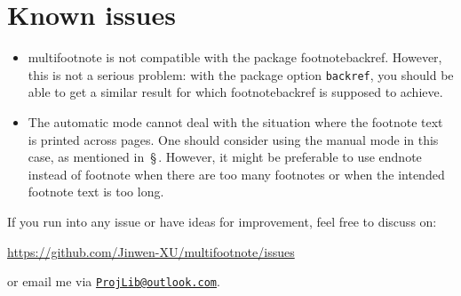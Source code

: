\documentclass[classical]{einfart}
\newcommand{\packageoption}[1]{\textcolor{code-option}{\texttt{#1}}}
\newcommand{\multifootnotepackage}{{\normalfont\textsf{multifootnote}}}
\begin{document}
\section{Known issues}

\begin{itemize}
    \item \multifootnotepackage{} is not compatible with the package \textsf{footnotebackref}. However, this is not a serious problem: with the package option \packageoption{backref}, you should be able to get a similar result for which \textsf{footnotebackref} is supposed to achieve.
    \item The automatic mode cannot deal with the situation where the footnote text is printed across pages. One should consider using the manual mode in this case, as mentioned in~\S\,. However, it might be preferable to use endnote instead of footnote when there are too many footnotes or when the intended footnote text is too long.
\end{itemize}

\medskip
If you run into any issue or have ideas for improvement, feel free to discuss on:
\begin{center}
    \url{https://github.com/Jinwen-XU/multifootnote/issues}
\end{center}
or email me via \href{mailto:ProjLib@outlook.com}{\texttt{ProjLib@outlook.com}}.
\end{document}
